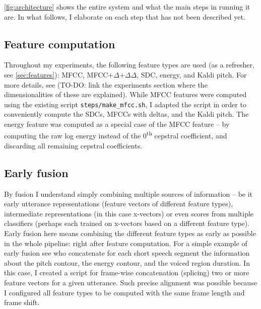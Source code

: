 \documentclass[bsc,frontabs,twoside,singlespacing,parskip,deptreport]{infthesis}
\begin{document}
{{    %

    \autoref{fig:architecture} shows the entire system and what the main steps in running it are. In what follows, I elaborate on each step that has not been described yet.

    \subsection{Feature computation}{
      \label{sec:feature-computation}
      Throughout my experiments, the following feature types are used (as a refresher, see \autoref{sec:features}): MFCC, MFCC+$\Delta$+$\Delta\Delta$, SDC, energy, and Kaldi pitch. For more details, see (TO-DO: link the experiments section where the dimensionalities of these are explained).
      While MFCC features were computed using the existing script \verb|steps/make_mfcc.sh|, I adapted the script in order to conveniently compute the SDCs, MFCCs with deltas, and the Kaldi pitch. The energy feature was computed as a special case of the MFCC feature -- by computing the raw log energy instead of the 0\textsuperscript{th} cepstral coefficient, and discarding all remaining cepstral coefficients.
    }

    \subsection{Early fusion}{
      \label{sec:early-fusion}
      By fusion I understand simply combining multiple sources of information -- be it early utterance representations (feature vectors of different feature types), intermediate representations (in this case x-vectors) or even scores from multiple classifiers (perhaps each trained on x-vectors based on a different feature type).
      Early fusion here means combining the different feature types as early as possible in the whole pipeline: right after feature computation. For a simple example of early fusion see \citet{Martinez_et_al_2012} who concatenate for each short speech segment the information about the pitch contour, the energy contour, and the voiced region duration. In this case, I created a script for frame-wise concatenation (splicing) two or more feature vectors for a given utterance. Such precise alignment was possible because I configured all feature types to be computed with the same frame length and frame shift.
    }

}}
\end{document}
